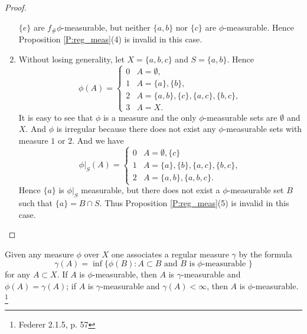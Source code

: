 \begin{proof}
\begin{enumerate}
    $\{e\}$ are $f_\#\phi$-measurable, but neither $\{a,b\}$ nor $\{c\}$ are
    $\phi$-measurable. Hence Proposition \ref{P:reg_meas}(4) is invalid in this
    case.
  \item Without losing generality, let $X=\{a,b,c\}$ and $S=\{a,b\}$. Hence
    \begin{equation*}
      \phi(A) =
      \begin{cases}
        0 & A=\emptyset,  \\
        1 & A=\{a\},\{b\},  \\
        2 & A=\{a,b\},\{c\},\{a,c\},\{b,c\},  \\
        3 & A=X.
      \end{cases}
    \end{equation*}
    It is easy to see that $\phi$ is a measure and the only $\phi$-measurable
    sets are $\emptyset$ and $X$. And $\phi$ is irregular because there does 
    not exist any $\phi$-measurable sets with measure $1$ or $2$. And we have
    \begin{equation*}
      \phi|_S(A) =
      \begin{cases}
        0 & A=\emptyset,\{c\}  \\
        1 & A=\{a\},\{b\},\{a,c\},\{b,c\},  \\
        2 & A=\{a,b\},\{a,b,c\}.
      \end{cases}
    \end{equation*}
    Hence $\{a\}$ is $\phi|_S$ measurable, but there does not exist a
    $\phi$-measurable set $B$ such that $\{a\}=B\cap S$.
    Thus Proposition \ref{P:reg_meas}(5) is invalid in this case.
\end{enumerate}
\end{proof}


\begin{lemma} \label{L:regul}
Given any measure $\phi$ over $X$ one associates a regular measure $\gamma$ by
the formula
\[
  \gamma(A)=\inf \{\phi(B): \text{$A\subset B$ and $B$ is $\phi$-measurable } \}
\]
for any $A\subset X$. If $A$ is $\phi$-measurable, then $A$ is
$\gamma$-measurable and $\phi(A)=\gamma(A)$; if $A$ is $\gamma$-measurable and
$\gamma(A)<\infty$, then $A$ is $\phi$-measurable.
\footnote{Federer 2.1.5, p. 57}
\end{lemma}

